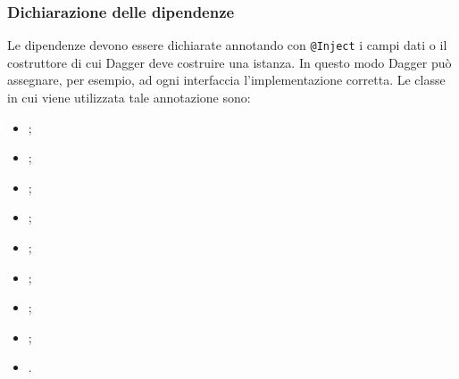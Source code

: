 \documentclass[../ManualeSviluppatore.tex]{subfiles}
\begin{document}
		\subsubsection{Dichiarazione delle dipendenze}
	Le dipendenze devono essere dichiarate annotando con \lstinline|@Inject| i campi dati o il costruttore di cui Dagger deve costruire una istanza. In questo modo Dagger può assegnare, per esempio, ad ogni interfaccia l'implementazione corretta. Le classe in cui viene utilizzata tale annotazione sono:
	\begin{itemize}
		\item \HomeActivity;
		\item \DeveloperUnlockerActivity;
		\item \LogInformationActivity;
		\item \MainDeveloperActivity;
		\item \MainDeveloperPresenter;
		\item \MyApplication;
		\item \NavigationActivity;
		\item \NearbyPoiActivity;
		\item \PoiCategoryActivity.
	\end{itemize}
\end{document}

